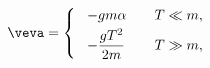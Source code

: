 \begin{equation}
\label{eq:vev}
\veva=\left\{\ \begin{array}{ll} -gm\alpha&\quad T\ll m,\\[1mm] 
      -\dfrac{gT^2}{2m} &\quad T\gg m, \end{array}\right.
\end{equation}


